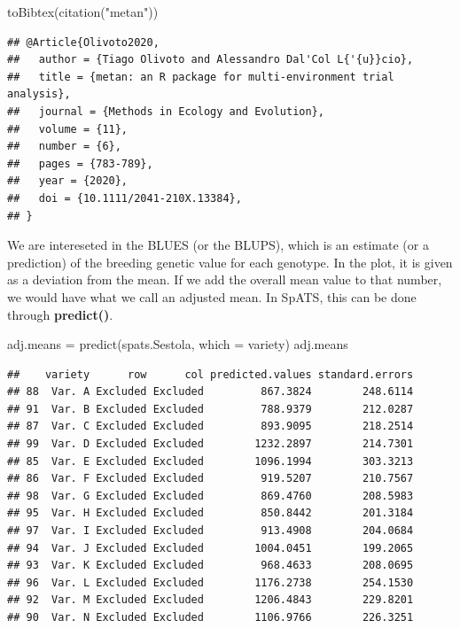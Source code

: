 \documentclass[
]{book}
\newenvironment{Shaded}{\begin{snugshade}}{\end{snugshade}}
\newcommand{\AttributeTok}[1]{\textcolor[rgb]{0.77,0.63,0.00}{#1}}
\newcommand{\FunctionTok}[1]{\textcolor[rgb]{0.00,0.00,0.00}{#1}}
\newcommand{\NormalTok}[1]{#1}
\newcommand{\OtherTok}[1]{\textcolor[rgb]{0.56,0.35,0.01}{#1}}
\newcommand{\StringTok}[1]{\textcolor[rgb]{0.31,0.60,0.02}{#1}}
\begin{document}
\begin{Shaded}
\begin{Highlighting}[]
\FunctionTok{toBibtex}\NormalTok{(}\FunctionTok{citation}\NormalTok{(}\StringTok{"metan"}\NormalTok{))}
\end{Highlighting}
\end{Shaded}

\begin{verbatim}
## @Article{Olivoto2020,
##   author = {Tiago Olivoto and Alessandro Dal'Col L{'{u}}cio},
##   title = {metan: an R package for multi-environment trial analysis},
##   journal = {Methods in Ecology and Evolution},
##   volume = {11},
##   number = {6},
##   pages = {783-789},
##   year = {2020},
##   doi = {10.1111/2041-210X.13384},
## }
\end{verbatim}

We are intereseted in the BLUES (or the BLUPS), which is an estimate (or a prediction) of the breeding genetic value for each genotype. In the plot, it is given as a deviation from the mean. If we add the overall mean value to that number, we would have what we call an adjusted mean. In SpATS, this can be done through \textbf{predict()}.

\begin{Shaded}
\begin{Highlighting}[]
\NormalTok{adj.means }\OtherTok{=} \FunctionTok{predict}\NormalTok{(spats.Sestola, }\AttributeTok{which =} \StringTok{\textquotesingle{}variety\textquotesingle{}}\NormalTok{)}
\NormalTok{adj.means}
\end{Highlighting}
\end{Shaded}

\begin{verbatim}
##    variety      row      col predicted.values standard.errors
## 88  Var. A Excluded Excluded         867.3824        248.6114
## 91  Var. B Excluded Excluded         788.9379        212.0287
## 87  Var. C Excluded Excluded         893.9095        218.2514
## 99  Var. D Excluded Excluded        1232.2897        214.7301
## 85  Var. E Excluded Excluded        1096.1994        303.3213
## 86  Var. F Excluded Excluded         919.5207        210.7567
## 98  Var. G Excluded Excluded         869.4760        208.5983
## 95  Var. H Excluded Excluded         850.8442        201.3184
## 97  Var. I Excluded Excluded         913.4908        204.0684
## 94  Var. J Excluded Excluded        1004.0451        199.2065
## 93  Var. K Excluded Excluded         968.4633        208.0695
## 96  Var. L Excluded Excluded        1176.2738        254.1530
## 92  Var. M Excluded Excluded        1206.4843        229.8201
## 90  Var. N Excluded Excluded        1106.9766        226.3251
\end{verbatim}
\end{document}
